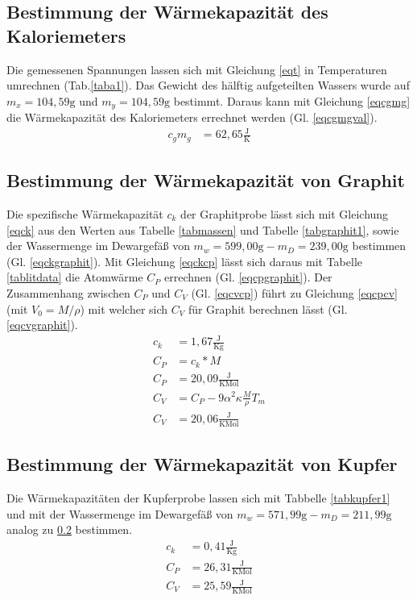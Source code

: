 \subsection{Bestimmung der Wärmekapazität des Kaloriemeters}
 
Die gemessenen Spannungen lassen sich mit Gleichung \ref{eqt} in Temperaturen umrechnen (Tab.\ref{taba1}).
Das Gewicht des hälftig aufgeteilten Wassers wurde auf $m_x=104,59\text{g}$ und $m_y=104,59\text{g}$ 
bestimmt. Daraus kann mit Gleichung \ref{eqcgmg} die Wärmekapazität des Kaloriemeters errechnet werden 
(Gl. \ref{eqcgmgval}).
\begin{align}
	c_gm_g&=62,65\frac{\text{J}}{\text{K}} \label{eqcgmgval}
\end{align}
\subsection{Bestimmung der Wärmekapazität von Graphit} \label{subsec:graphit}
 
Die spezifische Wärmekapazität $c_k$ der Graphitprobe lässt sich mit Gleichung \ref{eqck} aus den Werten aus
Tabelle \ref{tabmassen} und Tabelle \ref{tabgraphit1}, sowie der Wassermenge im Dewargefäß von 
$m_w=599,00\text{g}-m_D=239,00\text{g}$ bestimmen (Gl. \ref{eqckgraphit}). Mit Gleichung \ref{eqckcp} lässt
sich daraus mit Tabelle \ref{tablitdata} die Atomwärme $C_P$ errechnen (Gl. \ref{eqcpgraphit}).
Der Zusammenhang zwischen $C_P$ und $C_V$ (Gl. \ref{eqcvcp}) führt zu Gleichung \ref{eqcpcv} (mit 
$V_0=M/\rho$) mit welcher sich $C_V$ für Graphit berechnen lässt (Gl. \ref{eqcvgraphit}).
\begin{align}
c_k&=1,67 \frac{\text{J}}{\text{K} \text{g}} \label{eqckgraphit}\\
C_P&=c_k * M \label{eqckcp} \\
C_P&=20,09 \frac{\text{J}}{\text{K} \text{Mol}} \label{eqcpgraphit} \\
C_V&= C_P - 9 \alpha^2 \kappa \frac{M}{\rho} T_m \label{eqcpcv}\\
C_V&= 20,06 \frac{\text{J}}{\text{K} \text{Mol}} \label{eqcvgraphit}
\end{align}
\subsection{Bestimmung der Wärmekapazität von Kupfer}

Die Wärmekapazitäten der Kupferprobe lassen sich mit Tabbelle \ref{tabkupfer1} und mit 
der Wassermenge im Dewargefäß von $m_w=571,99\text{g}-m_D=211,99\text{g}$ 
analog zu \ref{subsec:graphit} bestimmen.
\begin{align}
c_k&=0,41 \frac{\text{J}}{\text{K} \text{g}} \\
C_P&=26,31 \frac{\text{J}}{\text{K} \text{Mol}} \\
C_V&=25,59  \frac{\text{J}}{\text{K} \text{Mol}} 
\end{align}
